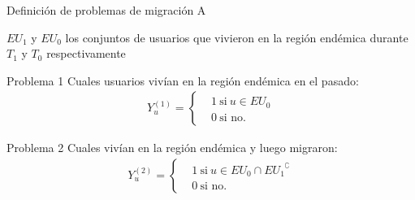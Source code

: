 \documentclass[xcolor=x11names]{beamer}
\begin{document}

\begin{frame}{Definición de problemas de migración A}

	$EU_{1}$ y $EU_{0}$ los conjuntos de usuarios que vivieron en la región endémica durante $T_1$ y $T_0$ respectivamente
	\begin{block}{Problema 1}
	Cuales usuarios vivían en la región endémica en el pasado:
		\begin{align*}
		Y^{(1)}_u =
		\begin{cases}
		&1 \ \mbox{si} \ u \in EU_{0} \\
		&0 \ \mbox{si no}.
		\end{cases}
		\end{align*}
	\end{block}


	\begin{block}{Problema 2}
		Cuales vivían en la región endémica y luego migraron:
		\begin{align*}
			Y^{(2)}_u =
			\begin{cases}
				&1 \ \mbox{si} \ u \in EU_{0} \cap { EU_{1} }^{\complement}  \\
				&0 \ \mbox{si no}.
			\end{cases}
		\end{align*}
	\end{block}

\end{frame}

\end{document}
